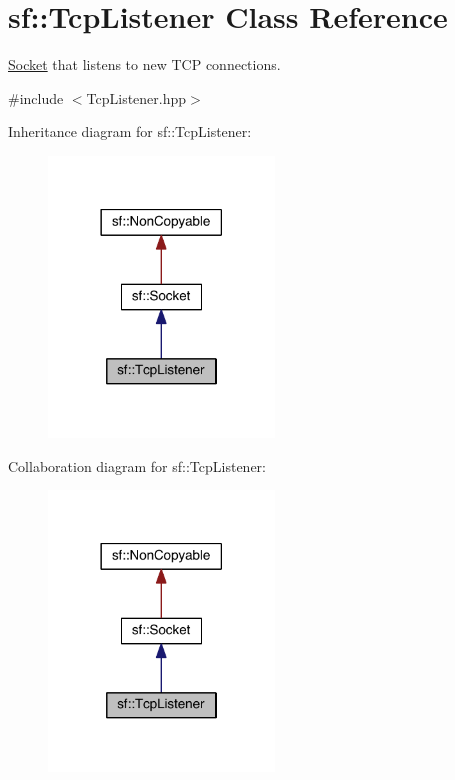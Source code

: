 \hypertarget{classsf_1_1_tcp_listener}{\section{sf\-:\-:Tcp\-Listener Class Reference}
\label{classsf_1_1_tcp_listener}
}


\hyperlink{classsf_1_1_socket}{Socket} that listens to new T\-C\-P connections.  




{\ttfamily \#include $<$Tcp\-Listener.\-hpp$>$}



Inheritance diagram for sf\-:\-:Tcp\-Listener\-:
\nopagebreak
\begin{figure}[H]
\begin{center}
\leavevmode
\includegraphics[width=170pt]{classsf_1_1_tcp_listener__inherit__graph}
\end{center}
\end{figure}


Collaboration diagram for sf\-:\-:Tcp\-Listener\-:
\nopagebreak
\begin{figure}[H]
\begin{center}
\leavevmode
\includegraphics[width=170pt]{classsf_1_1_tcp_listener__coll__graph}
\end{center}
\end{figure}
